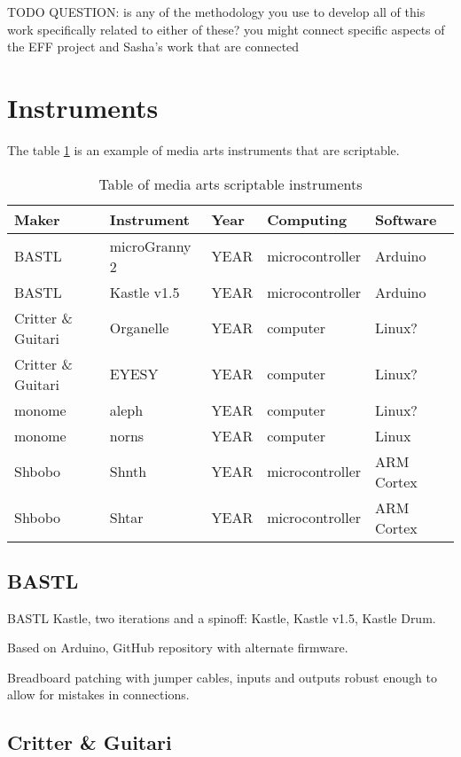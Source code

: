 TODO QUESTION: is any of the methodology you use to develop all of this work specifically related to either of these? you might connect specific aspects of the EFF project and Sasha's work that are connected


\section{Instruments}

The table \ref{table:media-arts-scriptable-instruments} is an example of media arts instruments that are scriptable.

\begin{table}[h!]
    \centering
    \begin{tabular}{ | l | l | l | l | l | }
        Maker & Instrument & Year & Computing & Software \\ 
        \hline 
        BASTL & microGranny 2 & YEAR & microcontroller & Arduino \\
        BASTL & Kastle v1.5 & YEAR &microcontroller  & Arduino \\
        Critter \& Guitari & Organelle & YEAR & computer & Linux? \\
        Critter \& Guitari & EYESY & YEAR & computer & Linux? \\
        monome & aleph & YEAR & computer & Linux? \\
        monome & norns & YEAR & computer & Linux \\
        Shbobo & Shnth & YEAR & microcontroller & ARM Cortex \\
        Shbobo & Shtar & YEAR & microcontroller & ARM Cortex 
    \end{tabular}
    \caption{Table of media arts scriptable instruments}
    \label{table:media-arts-scriptable-instruments}
\end{table}


\subsection{BASTL}

BASTL Kastle, two iterations and a spinoff: Kastle, Kastle v1.5, Kastle Drum. 

Based on Arduino, GitHub repository with alternate firmware.

Breadboard patching with jumper cables, inputs and outputs robust enough to allow for mistakes in connections.

\subsection{Critter \& Guitari}


